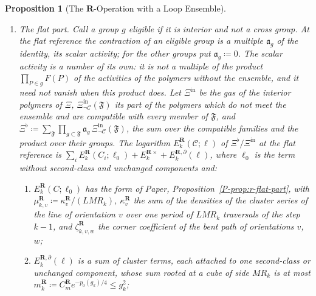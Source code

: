 \documentclass[11pt]{preprint}
\numberwithin{equation}{section}
\newtheorem{proposition}{Proposition}
\theoremstyle{definition}
\theoremstyle{remark}
\theoremstyle{plain}
\begin{document}
\begin{proposition}[The $\mathbf R$-Operation with a Loop Ensemble]
\begin{enumerate}[label=(\roman*)]
\begin{equation}\label{eq:decorated-ratio}
    \frac{\Xi^{\mathcal C}}{\Xi} = \sum_{(\mathfrak F, \mathcal Y, \mathcal P)}e^{-\Phi^\flat(\mathfrak F)}A^{\mathcal C}(\mathfrak F, \mathcal P)\prod_{c \in \mathcal Y}\mathfrak d_c\;,
\end{equation}
the sum over the decorated families, which converges absolutely; here $A^{\mathcal C}(\mathfrak F, \mathcal P)$ is the product over the loops of the traces of the ordered products of the tensors $T_P$, $P \in \mathfrak F$, and of the letters in no slot, each at its piece of $\mathcal P$ if it has one and at $U^R$ otherwise.
\item \emph{The flat part.} Call a group $g$ \emph{eligible} if it is interior and not a cross group. At the flat reference the contraction of an eligible group is a multiple $\mathfrak a_g$ of the identity, its \emph{scalar activity}; for the other groups put $\mathfrak a_g \coloneqq 0$. The scalar activity is a number of its own: it is not a multiple of the product $\prod_{P \in g}F(P)$ of the activities of the polymers without the ensemble, and it need not vanish when this product does. Let $\Xi^{\mathrm{in}}$ be the gas of the interior polymers of $\Xi$, $\Xi^{\mathrm{in}}_{\neg\mathcal C}(\mathfrak F)$ its part of the polymers which do not meet the ensemble and are compatible with every member of $\mathfrak F$, and $\Xi^\flat \coloneqq \sum_{\mathfrak F}\prod_{g \subset \mathfrak F}\mathfrak a_g\,\Xi^{\mathrm{in}}_{\neg\mathcal C}(\mathfrak F)$, the sum over the compatible families and the product over their groups. The logarithm $E^{\mathbf R}_k(\mathcal C; \ell)$ of $\Xi^\flat/\Xi^{\mathrm{in}}$ at the flat reference is $\sum_iE^{\mathbf R}_k(C_i; \ell_0) + E^{\mathbf R\times}_k + E^{\mathbf R,\partial}_k(\ell)$, where $\ell_0$ is the term without second-class and unchanged components and:
\begin{enumerate}[label=(\alph*)]
\item $E^{\mathbf R}_k(C; \ell_0)$ has the form of Paper, Proposition~\ref{P-prop:r-flat-part}, with $\mu^{\mathbf R}_{k,v} \coloneqq \kappa^{\mathbf R}_v/(LMR_k)$, $\kappa^{\mathbf R}_v$ the sum of the densities of the cluster series of the line of orientation $v$ over one period of $LMR_k$ traversals of the step $k - 1$, and $\zeta^{\mathbf R}_{k,v,w}$ the corner coefficient of the bent path of orientations $v$, $w$;
\item $E^{\mathbf R,\partial}_k(\ell)$ is a sum of cluster terms, each attached to one second-class or unchanged component, whose sum rooted at a cube of side $MR_k$ is at most $m^{\mathbf R}_k \coloneqq C^{\mathbf R}_me^{-p_0(g_k)/4} \leq g_k^2$;

\end{enumerate}
\end{enumerate}
\end{proposition}
\end{document}
